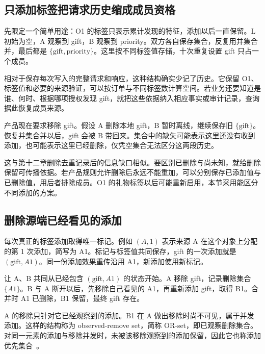 \subsection*{只添加标签把请求历史缩成成员资格}

先限定一个简单用途：O1 的标签只表示累计发现的特征，添加以后一直保留。L 初始为空，A 观察到 gift，B 观察到 priority。双方各自保存集合，反复用并集合并，最后都是 $\{\mathrm{gift},\mathrm{priority}\}$。这里按不同标签值存储，十次重复设置 gift 只占一个成员。

相对于保存每次写入的完整请求和响应，这种结构确实少记了历史。它保留 O1、标签值和必要的来源验证，可以按订单与不同标签数计算空间。若业务还要知道是谁、何时、根据哪项授权发现 gift，就把这些依据纳入相应事实或审计记录，查询据此恢复成员来源。

产品现在要求移除 gift。假设 A 删除本地 gift，B 暂时离线，继续保存旧 $\{\mathrm{gift}\}$。恢复并集合并以后，gift 会被 B 带回来。集合中的缺失可能表示这里还没有收到添加，也可能表示这里已经删除，仅凭空集合无法区分这两段历史。


这与第十二章删除去重记录后的信息缺口相似。要区别已删除与尚未知，就给删除保留可传播依据。若产品规则允许删除后永远不能重加，可以分别保存已添加值与已删除值，用后者排除成员。O1 的礼物标签以后可能重新启用，本节采用能区分不同添加的方案。

\subsection*{删除源端已经看见的添加}

每次真正的标签添加取得唯一标记。例如 $(A,1)$ 表示来源 A 在这个对象上分配的第 1 次添加，简写为 A1。标记与标签值共同保存，gift 的一次添加就是 $(\mathrm{gift},A1)$。同一份添加效果重传沿用 A1，新添加使用新标记。

让 A、B 共同从已经包含 $(\mathrm{gift},A1)$ 的状态开始。A 移除 gift，记录删除集合 $\{A1\}$。B 与 A 断开以后，先移除自己看见的 A1，再重新添加 gift，取得 B1。合并时 A1 已删除，B1 保留，最终 gift 存在。

A 的移除只针对它已经观察到的添加。B1 在 A 做出移除时尚不可见，属于并发添加。这样的结构称为 observed-remove set，简称 OR-set，即已观察删除集合。对同一元素的添加与移除并发时，未被该移除观察到的添加保留，因此它也称添加优先集合~\cite{preguica2018crdt,bieniusa2012orset}。


